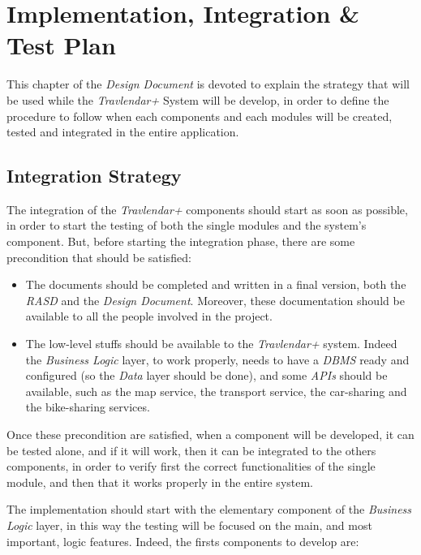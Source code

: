 \chapter{Implementation, Integration \& Test Plan}

This chapter of the \emph{Design Document} is devoted to explain the strategy that will be used while the \emph{Travlendar+} System will be develop, in order to define the procedure to follow when each components and each modules will be created, tested and integrated in the entire application.

\section{Integration Strategy}
The integration of the \emph{Travlendar+} components should start as soon as possible, in order to start the testing of both the single modules and the system's component.
But, before starting the integration phase, there are some precondition that should be satisfied:

\begin{itemize}

    \item The documents should be completed and written in a final version, both the \emph{RASD} and the \emph{Design Document}. Moreover, these documentation should be available to all the people involved in the project.
    
    \item The low-level stuffs should be available to the \emph{Travlendar+} system. Indeed the \emph{Business Logic} layer, to work properly, needs to have a \emph{DBMS} ready and configured (so the \emph{Data} layer should be done), and some \emph{APIs} should be available, such as the map service, the transport service, the car-sharing and the bike-sharing services.
    
\end{itemize}

Once these precondition are satisfied, when a component will be developed, it can be tested alone, and if it will work, then it can be integrated to the others components, in order to verify first the correct functionalities of the single module, and then that it works properly in the entire system.

The implementation should start with the elementary component of the \emph{Business Logic} layer, in this way the testing will be focused on the main, and most important, logic features. Indeed, the firsts components to develop are:

